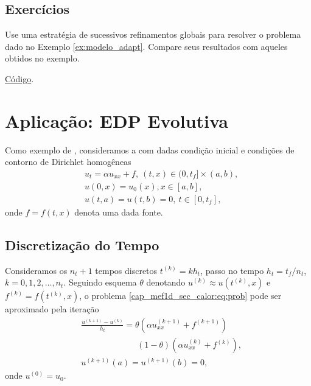 \subsection{Exercícios}

\begin{exer}\label{exer:modelo_refglobal}
  Use uma estratégia de sucessivos refinamentos globais para resolver o problema dado no Exemplo \ref{ex:modelo_adapt}. Compare seus resultados com aqueles obtidos no exemplo.
\end{exer}
\begin{resp}
  \ifispython
  \href{https://github.com/phkonzen/notas/blob/master/src/MetodoElementosFinitos/cap_mef1d/dados/exer_dcr/exer_dcr.py}{Código}.
  \fi  
\end{resp}

\section{Aplicação: EDP Evolutiva}\label{cap_mef1d_sec_calor}

Como exemplo de , consideramos a  com dadas condição inicial e condições de contorno de Dirichlet homogêneas
\begin{subequations}\label{cap_mef1d_sec_calor:eq:prob}
  \begin{align}
    &u_t = \alpha u_{xx} + f, ~(t,x)\in (0, t_f]\times (a, b),\\
    &u(0, x) = u_0(x), x\in [a, b],\\
    &u(t, a) = u(t, b) = 0, ~t\in [0, t_f],
  \end{align}
\end{subequations}
onde $f = f(t, x)$ denota uma dada fonte.

\subsection{Discretização do Tempo}

Consideramos os $n_t+1$ tempos discretos $t^{(k)} = k h_t$, passo no tempo $h_t = t_f/n_t$, $k = 0, 1, 2, \dotsc, n_t$. Seguindo esquema $\theta$ denotando $u^{(k)} \approx u\left(t^{(k)}, x\right)$ e $f^{(k)} = f\left(t^{(k)}, x\right)$, o problema \eqref{cap_mef1d_sec_calor:eq:prob} pode ser aproximado pela iteração
\begin{subequations}\label{cap_mef1d_sec_calor:eq:theta}
  \begin{align}
    &\frac{u^{(k+1)} - u^{(k)}}{h_t} = \theta \left(\alpha u^{(k+1)}_{xx} + f^{(k+1)}\right)\nonumber\\
    &\qquad\qquad\qquad\;\; (1-\theta) \left(\alpha u^{(k)}_{xx} + f^{(k)}\right),\\
    &u^{(k+1)}(a) = u^{(k+1)}(b) = 0,
  \end{align}
\end{subequations}
onde $u^{(0)} = u_0$. 

